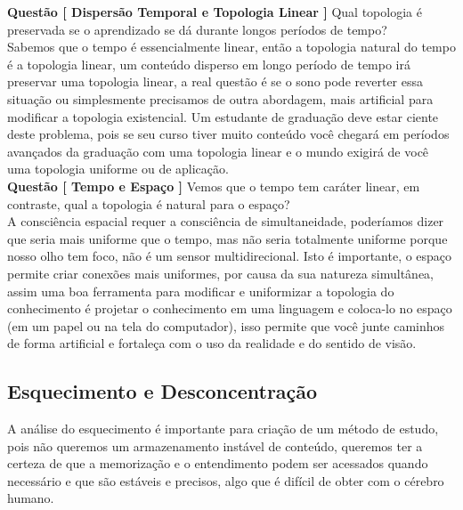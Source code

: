\textbf{Questão [ Dispersão Temporal e Topologia Linear ]} Qual topologia é preservada se o aprendizado se dá durante longos períodos de tempo?\\

Sabemos que o tempo é essencialmente linear, então a topologia natural do tempo é a topologia linear, um conteúdo disperso em longo período de tempo irá preservar uma topologia linear, a real questão é se o sono pode reverter essa situação ou simplesmente precisamos de outra abordagem, mais artificial para modificar a topologia existencial. Um estudante de graduação deve estar ciente deste problema, pois se seu curso tiver muito conteúdo você chegará em períodos avançados da graduação com uma topologia linear e o mundo exigirá de você uma topologia uniforme ou de aplicação. \\

\textbf{Questão [ Tempo e Espaço ]} Vemos que o tempo tem caráter linear, em contraste, qual a topologia é natural para o espaço?\\

A consciência espacial requer a consciência de simultaneidade, poderíamos dizer que seria mais uniforme que o tempo, mas não seria totalmente uniforme porque nosso olho tem foco, não é um sensor multidirecional. Isto é importante, o espaço permite criar conexões mais uniformes, por causa da sua natureza simultânea, assim uma boa ferramenta para modificar e uniformizar a topologia do conhecimento é projetar o conhecimento em uma linguagem e coloca-lo no espaço (em um papel ou na tela do computador), isso permite que você junte caminhos de forma artificial e fortaleça com o uso da realidade e do sentido de visão.\\

\subsection{Esquecimento e Desconcentração}

% 
\hspace{\baselineskip}

A análise do esquecimento é importante para criação de um método de estudo, pois não queremos um armazenamento instável de conteúdo, queremos ter a certeza de que a memorização e o entendimento podem ser acessados quando necessário e que são estáveis e precisos, algo que é difícil de obter com o cérebro humano.\\

